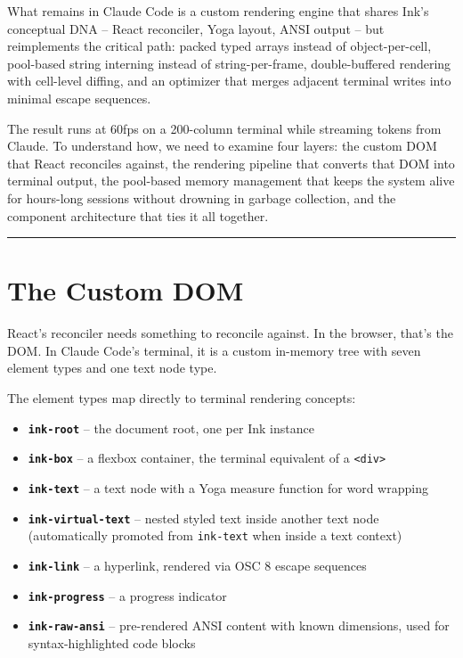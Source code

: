 \documentclass[
  english,
  11pt,
  letterpaper,
]{book}
\providecommand{\tightlist}{%
  \setlength{\itemsep}{0pt}\setlength{\parskip}{0pt}}
\begin{document}
What remains in Claude Code is a custom rendering engine that shares
Ink's conceptual DNA -- React reconciler, Yoga layout, ANSI output --
but reimplements the critical path: packed typed arrays instead of
object-per-cell, pool-based string interning instead of
string-per-frame, double-buffered rendering with cell-level diffing, and
an optimizer that merges adjacent terminal writes into minimal escape
sequences.

The result runs at 60fps on a 200-column terminal while streaming tokens
from Claude. To understand how, we need to examine four layers: the
custom DOM that React reconciles against, the rendering pipeline that
converts that DOM into terminal output, the pool-based memory management
that keeps the system alive for hours-long sessions without drowning in
garbage collection, and the component architecture that ties it all
together.

\begin{center}\rule{0.5\linewidth}{0.5pt}\end{center}

\section{The Custom DOM}\label{the-custom-dom}

React's reconciler needs something to reconcile against. In the browser,
that's the DOM. In Claude Code's terminal, it is a custom in-memory tree
with seven element types and one text node type.

The element types map directly to terminal rendering concepts:

\begin{itemize}
\tightlist
\item
  \textbf{\texttt{ink-root}} -- the document root, one per Ink instance
\item
  \textbf{\texttt{ink-box}} -- a flexbox container, the terminal
  equivalent of a \texttt{\textless{}div\textgreater{}}
\item
  \textbf{\texttt{ink-text}} -- a text node with a Yoga measure function
  for word wrapping
\item
  \textbf{\texttt{ink-virtual-text}} -- nested styled text inside
  another text node (automatically promoted from \texttt{ink-text} when
  inside a text context)
\item
  \textbf{\texttt{ink-link}} -- a hyperlink, rendered via OSC 8 escape
  sequences
\item
  \textbf{\texttt{ink-progress}} -- a progress indicator
\item
  \textbf{\texttt{ink-raw-ansi}} -- pre-rendered ANSI content with known
  dimensions, used for syntax-highlighted code blocks
\end{itemize}
\end{document}
